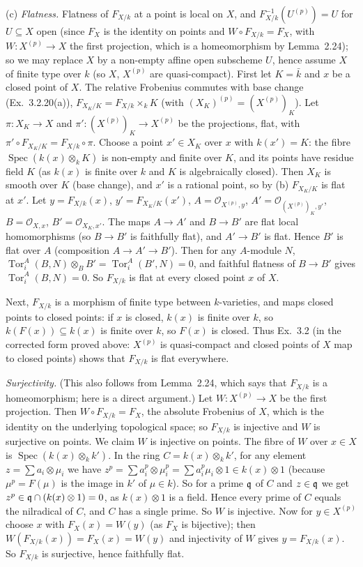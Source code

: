 \documentclass[11pt]{article}
\begin{document}
(c) \emph{Flatness.} Flatness of $F_{X/k}$ at a point is local on $X$, and $F_{X/k}^{-1}(U^{(p)})=U$ for $U\subseteq X$ open (since $F_X$ is the identity on points and $W\circ F_{X/k}=F_X$, with $W:X^{(p)}\to X$ the first projection, which is a homeomorphism by Lemma~2.24); so we may replace $X$ by a non-empty affine open subscheme $U$, hence assume $X$ of finite type over $k$ (so $X$, $X^{(p)}$ are quasi-compact). First let $K=\bar k$ and $x$ be a closed point of $X$. The relative Frobenius commutes with base change (Ex.~3.2.20(a)), $F_{X_K/K}=F_{X/k}\times_kK$ (with $(X_K)^{(p)}=(X^{(p)})_K$). Let $\pi:X_K\to X$ and $\pi':(X^{(p)})_K\to X^{(p)}$ be the projections, flat, with $\pi'\circ F_{X_K/K}=F_{X/k}\circ\pi$. Choose a point $x'\in X_K$ over $x$ with $k(x')=K$: the fibre $\operatorname{Spec}(k(x)\otimes_kK)$ is non-empty and finite over $K$, and its points have residue field $K$ (as $k(x)$ is finite over $k$ and $K$ is algebraically closed). Then $X_K$ is smooth over $K$ (base change), and $x'$ is a rational point, so by (b) $F_{X_K/K}$ is flat at $x'$. Let $y=F_{X/k}(x)$, $y'=F_{X_K/K}(x')$, $A=\mathcal O_{X^{(p)},y}$, $A'=\mathcal O_{(X^{(p)})_K,y'}$, $B=\mathcal O_{X,x}$, $B'=\mathcal O_{X_K,x'}$. The maps $A\to A'$ and $B\to B'$ are flat local homomorphisms (so $B\to B'$ is faithfully flat), and $A'\to B'$ is flat. Hence $B'$ is flat over $A$ (composition $A\to A'\to B'$). Then for any $A$-module $N$, $\operatorname{Tor}_i^A(B,N)\otimes_BB'=\operatorname{Tor}_i^A(B',N)=0$, and faithful flatness of $B\to B'$ gives $\operatorname{Tor}_i^A(B,N)=0$. So $F_{X/k}$ is flat at every closed point $x$ of $X$.

Next, $F_{X/k}$ is a morphism of finite type between $k$-varieties, and maps closed points to closed points: if $x$ is closed, $k(x)$ is finite over $k$, so $k(F(x))\subseteq k(x)$ is finite over $k$, so $F(x)$ is closed. Thus Ex.~3.2 (in the corrected form proved above: $X^{(p)}$ is quasi-compact and closed points of $X$ map to closed points) shows that $F_{X/k}$ is flat everywhere.

\emph{Surjectivity.} (This also follows from Lemma~2.24, which says that $F_{X/k}$ is a homeomorphism; here is a direct argument.) Let $W:X^{(p)}\to X$ be the first projection. Then $W\circ F_{X/k}=F_X$, the absolute Frobenius of $X$, which is the identity on the underlying topological space; so $F_{X/k}$ is injective and $W$ is surjective on points. We claim $W$ is injective on points. The fibre of $W$ over $x\in X$ is $\operatorname{Spec}(k(x)\otimes_kk')$. In the ring $C=k(x)\otimes_kk'$, for any element $z=\sum a_i\otimes\mu_i$ we have $z^p=\sum a_i^p\otimes\mu_i^p=\sum a_i^p\mu_i\otimes1\in k(x)\otimes1$ (because $\mu^p=F(\mu)$ is the image in $k'$ of $\mu\in k$). So for a prime $\mathfrak q$ of $C$ and $z\in\mathfrak q$ we get $z^p\in\mathfrak q\cap(k(x)\otimes1)=0$, as $k(x)\otimes1$ is a field. Hence every prime of $C$ equals the nilradical of $C$, and $C$ has a single prime. So $W$ is injective. Now for $y\in X^{(p)}$ choose $x$ with $F_X(x)=W(y)$ (as $F_X$ is bijective); then $W(F_{X/k}(x))=F_X(x)=W(y)$ and injectivity of $W$ gives $y=F_{X/k}(x)$. So $F_{X/k}$ is surjective, hence faithfully flat.
\end{document}
